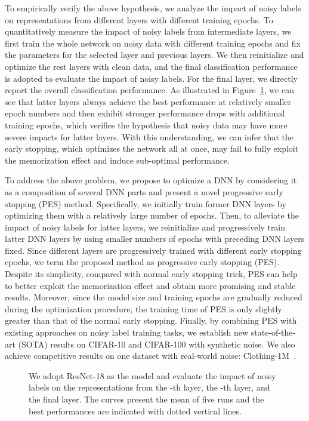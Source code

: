\documentclass[11pt]{article}
\begin{document}
To empirically verify the above hypothesis, we analyze the impact of noisy labels on representations from different layers with different training epochs. To quantitatively measure the impact of noisy labels from intermediate layers, we first train the whole network on noisy data with different training epochs and fix the parameters for the selected layer and previous layers. We then  reinitialize and optimize the rest layers with clean data, and the 
final classification performance is adopted to evaluate the impact of noisy labels. For the final layer, we directly report the overall classification performance. As illustrated in Figure~\ref{fig:1}, we can see that latter layers always achieve the best performance at relatively smaller epoch numbers and then exhibit stronger performance drops with additional training epochs, which verifies the hypothesis that noisy data may have more severe impacts for latter layers. 
 With this understanding, we can infer that the early stopping, which optimizes the network all at once, may fail to fully exploit the memorization effect and induce sub-optimal performance.

To address the above problem, we propose to optimize a DNN by considering it as a composition of several DNN parts and present a novel progressive early stopping (PES) method.  Specifically, we initially train former DNN layers by optimizing them with a relatively large number of epochs. Then, to alleviate the impact of noisy labels for latter layers, we reinitialize and progressively train latter DNN layers by using smaller numbers of epochs with preceding DNN layers fixed. Since different layers are progressively trained with different early stopping epochs, we term the proposed method as progressive early stopping (PES).  Despite its simplicity, compared with normal early stopping trick, PES can help to better exploit the memorization effect and obtain more promising and stable results. Moreover, since the model size and training epochs are gradually reduced during the optimization procedure, the training time of PES is only slightly greater than that of the normal early stopping. Finally, by combining PES with existing approaches on noisy label training tasks, we establish new state-of-the-art (SOTA) results on CIFAR-10 and CIFAR-100 with synthetic noise. We also achieve competitive results on one dataset with real-world noise: Clothing-1M~\cite{Xiao2015Clothing}.

\begin{figure}[!t]
\vspace{-10px}
\centering
{}
\caption{We adopt ResNet-18 as the model and evaluate the impact of noisy labels on the representations from the -th layer, the -th layer, and the final layer. The curves present the mean of five runs and the
best performances are indicated with dotted vertical lines.} 
\label{fig:1}
\vspace{-10px}
\end{figure}
\end{document}
